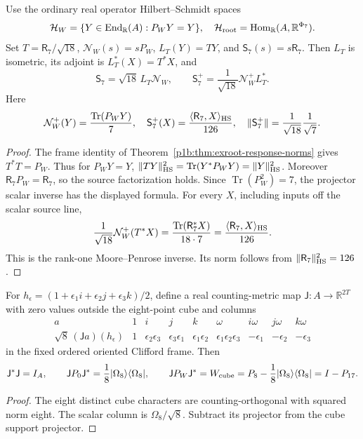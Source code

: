 \documentclass[11pt,a4paper]{article}
\begin{document}
\begin{theorem}
\label{p3b:thm:exroot-full-e7-inverse}
Use the ordinary real operator Hilbert--Schmidt spaces
\[
 \mathcal H_W=\{Y\in\operatorname{End}_{\mathbb R}(A):P_WY=Y\},
 \quad
 \mathcal H_{\rm root}=
 \operatorname{Hom}_{\mathbb R}(A,\mathbb R^{\Phi_7}).
\]
Set \(T=\mathsf R_7/\sqrt{18}\),
\(\mathcal N_W(s)=sP_W\), \(L_T(Y)=TY\), and
\(\mathsf S_7(s)=s\mathsf R_7\). Then \(L_T\) is isometric, its
adjoint is \(L_T^*(X)=T^*X\), and
\[
 \boxed{\mathsf S_7=\sqrt{18}\,L_T\mathcal N_W,\qquad
 \mathsf S_7^+=\frac1{\sqrt{18}}\mathcal N_W^+L_T^*.}
\]
Here
\[
 \mathcal N_W^+(Y)=\frac{\operatorname{Tr}(P_WY)}7,\quad
 \mathsf S_7^+(X)=
 \frac{\langle\mathsf R_7,X\rangle_{\rm HS}}{126},\quad
 \|\mathsf S_7^+\|=\frac1{\sqrt{18}}\frac1{\sqrt7}.
\]
\end{theorem}
\begin{proof}
The frame identity of
Theorem~\ref{p1b:thm:exroot-response-norms} gives \(T^*T=P_W\).
Thus for \(P_WY=Y\),
\(\|TY\|_{\rm HS}^2=\operatorname{Tr}(Y^*P_WY)=\|Y\|_{\rm HS}^2\).
Moreover \(\mathsf R_7P_W=\mathsf R_7\), so the source factorization
holds. Since \(\operatorname{Tr}(P_W^2)=7\), the projector scalar
inverse has the displayed formula. For every \(X\), including inputs
off the scalar source line,
\[
 \frac1{\sqrt{18}}\mathcal N_W^+(T^*X)
 =\frac{\operatorname{Tr}(\mathsf R_7^*X)}{18\cdot7}
 =\frac{\langle\mathsf R_7,X\rangle_{\rm HS}}{126}.
\]
This is the rank-one Moore--Penrose inverse. Its norm follows from
\(\|\mathsf R_7\|_{\rm HS}^2=126\).
\end{proof}

\begin{proposition}
\label{p3b:prop:exroot-walsh-complement}
For \(h_\epsilon=(1+\epsilon_1i+\epsilon_2j+\epsilon_3k)/2\),
define a real counting-metric map \(\mathsf J:A\to\mathbb R^{2T}\)
with zero values outside the eight-point cube and columns
\[
\begin{array}{c|cccccccc}
a&1&i&j&k&\omega&i\omega&j\omega&k\omega\\ \hline
\sqrt8\,(\mathsf Ja)(h_\epsilon)&
1&\epsilon_2\epsilon_3&\epsilon_3\epsilon_1&
\epsilon_1\epsilon_2&\epsilon_1\epsilon_2\epsilon_3&
-\epsilon_1&-\epsilon_2&-\epsilon_3
\end{array}
\]
in the fixed ordered oriented Clifford frame. Then
\[
 \mathsf J^*\mathsf J=I_A,\qquad
 \mathsf JP_0\mathsf J^*=\frac18|\Omega_8\rangle\langle\Omega_8|,
 \qquad
 \mathsf JP_W\mathsf J^*
 =W_{\rm cube}=P_8-\frac18|\Omega_8\rangle\langle\Omega_8|
 =I-P_{17}.
\]
\end{proposition}
\begin{proof}
The eight distinct cube characters are counting-orthogonal with squared
norm eight. The scalar column is \(\Omega_8/\sqrt8\).
Subtract its projector from the cube support projector.
\end{proof}
\end{document}
